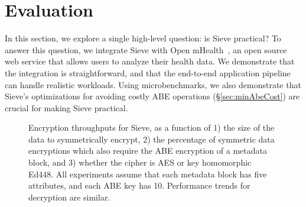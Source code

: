 \chapter{Evaluation}
\label{sec:evaluation}

In this section, we explore a single
high-level question: is Sieve practical?
To answer this question, we integrate
Sieve with Open mHealth~\cite{omh}, an
open source web service that allows users
to analyze their health data. We demonstrate
that the integration is straightforward, and
that the end-to-end application pipeline can
handle realistic workloads. Using
microbenchmarks, we also demonstrate that
Sieve's optimizations for avoiding costly
ABE operations (\S\ref{sec:minAbeCost})
are crucial for making Sieve practical.

\begin{figure}
\centering
    \caption[ABE throughputs for Sieve]{Encryption throughputs for Sieve, as a function of 1) the size of
             the data to symmetrically encrypt, 2) the percentage of symmetric
             data encryptions which also require the ABE encryption of a
             metadata block, and 3) whether the cipher is AES or
             key homomorphic Ed448. All experiments assume that each metadata
             block has five attributes, and each ABE key has 10. Performance
             trends for decryption are similar.}
\label{fig:throughput}
\end{figure}

